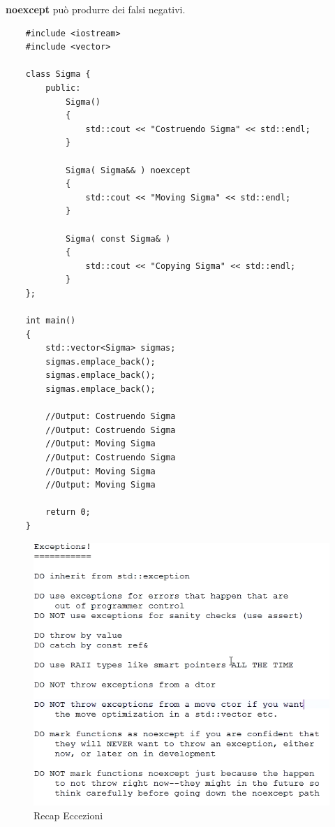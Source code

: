 \textsf{\small \textbf{noexcept} può produrre dei falsi negativi.} \\

\begin{lstlisting}
	#include <iostream>
	#include <vector>
	
	class Sigma {
		public:
			Sigma()
			{
				std::cout << "Costruendo Sigma" << std::endl;
			}
		
			Sigma( Sigma&& ) noexcept
			{
				std::cout << "Moving Sigma" << std::endl;
 			}
 		
 			Sigma( const Sigma& )
 			{
 				std::cout << "Copying Sigma" << std::endl;
 			}
	};

	int main()
	{
		std::vector<Sigma> sigmas;
		sigmas.emplace_back();
		sigmas.emplace_back();
		sigmas.emplace_back();
		
		//Output: Costruendo Sigma
		//Output: Costruendo Sigma
		//Output: Moving Sigma
		//Output: Costruendo Sigma
		//Output: Moving Sigma
		//Output: Moving Sigma
		
		return 0;
	}
\end{lstlisting}

\begin{figure}[H]
	\centering
	\includegraphics[width=1\textwidth, height=1\textheight, keepaspectratio]{./imgs/exceptions_recap2.png}
	\caption{Recap Eccezioni}
	\label{fig:"exceptions_recap2}
\end{figure}

